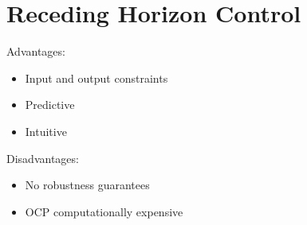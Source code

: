 \ETHslide
\section*{Receding Horizon Control}
\vspace*{\fill}

Advantages:
\begin{itemize}
\item[\ETHitem] Input and output constraints
\item[\ETHitem] Predictive
\item[\ETHitem] Intuitive
\end{itemize}
Disadvantages:
\begin{itemize}
\item[\ETHitem] No robustness guarantees
\item[\ETHitem] OCP computationally expensive
\end{itemize}

\vspace*{\fill}
\clearpage